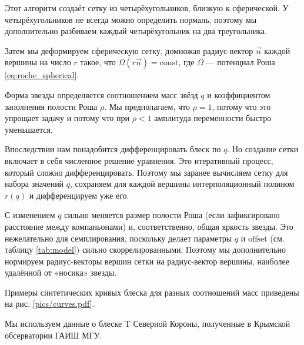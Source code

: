 Этот алгоритм создаёт сетку из четырёхугольников, близкую к сферической. У четырёхугольников не всегда можно определить нормаль, поэтому мы дополнительно разбиваем каждый четырёхугольник на два треугольника.

Затем мы деформируем сферическую сетку, домножая радиус-вектор $\vec n$ каждой вершины на число $r$ такое, что $\Omega(r \vec n) = \text{const}$, где $\Omega$ --- потенциал Роша \eqref{eq:roche_spherical}.

Форма звезды определяется соотношением масс звёзд $q$ и коэффициентом заполнения полости Роша $\rho.$ Мы предполагаем, что $\rho = 1$, потому что это упрощает задачу и потому что при $\rho < 1$ амплитуда переменности быстро уменьшается.

Впоследствии нам понадобится дифференцировать блеск по $q$. Но создание сетки включает в себя численное решение уравнения. Это итеративный процесс, который сложно дифференцировать. Поэтому мы заранее вычисляем сетку для набора значений $q$, сохраняем для каждой вершины интерполяционный полином $r(q)$ и дифференцируем уже его.

С изменением $q$ сильно меняется размер полости Роша (если зафиксировано расстояние между компаньонами) и, соответственно, общая яркость звезды. Это нежелательно для семплирования, поскольку делает параметры $q$ и $\text{offset}$ (см. таблицу \ref{tab:model}) сильно скоррелированными. Поэтому мы дополнительно нормируем радиус-векторы вершин сетки на радиус-вектор вершины, наиболее удалённой от «носика» звезды.

Примеры синтетических кривых блеска для разных соотношений масс приведены на рис. \ref{pics/curves.pdf}.















\label{sect:Brilliance}

Мы используем данные о блеске T Северной Короны, полученные в Крымской обсерватории ГАИШ МГУ.

